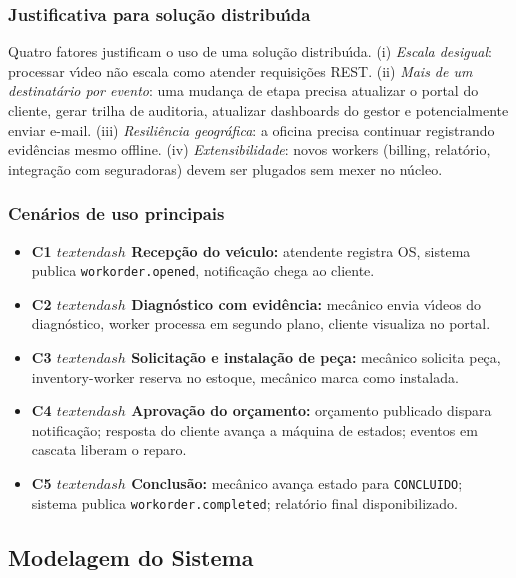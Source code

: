 \documentclass[10pt,a4paper]{article}
\begin{document}
\subsubsection*{Justificativa para solu\c{c}\~ao distribu\'\i da}

Quatro fatores justificam o uso de uma solu\c{c}\~ao distribu\'\i da. (i) \emph{Escala desigual}: processar v\'\i deo n\~ao escala como atender requisi\c{c}\~oes REST. (ii) \emph{Mais de um destinat\'ario por evento}: uma mudan\c{c}a de etapa precisa atualizar o portal do cliente, gerar trilha de auditoria, atualizar dashboards do gestor e potencialmente enviar e-mail. (iii) \emph{Resili\^encia geogr\'afica}: a oficina precisa continuar registrando evid\^encias mesmo offline. (iv) \emph{Extensibilidade}: novos workers (billing, relat\'orio, integra\c{c}\~ao com seguradoras) devem ser plugados sem mexer no n\'ucleo.

\subsubsection*{Cen\'arios de uso principais}
\begin{itemize}[leftmargin=*]
\item \textbf{C1 \(textendash\) Recep\c{c}\~ao do ve\'\i culo:} atendente registra OS, sistema publica \texttt{workorder.opened}, notifica\c{c}\~ao chega ao cliente.
\item \textbf{C2 \(textendash\) Diagn\'ostico com evid\^encia:} mec\^anico envia v\'\i deos do diagn\'ostico, worker processa em segundo plano, cliente visualiza no portal.
\item \textbf{C3 \(textendash\) Solicita\c{c}\~ao e instala\c{c}\~ao de pe\c{c}a:} mec\^anico solicita pe\c{c}a, inventory-worker reserva no estoque, mec\^anico marca como instalada.
\item \textbf{C4 \(textendash\) Aprova\c{c}\~ao do or\c{c}amento:} or\c{c}amento publicado dispara notifica\c{c}\~ao; resposta do cliente avan\c{c}a a m\'aquina de estados; eventos em cascata liberam o reparo.
\item \textbf{C5 \(textendash\) Conclus\~ao:} mec\^anico avan\c{c}a estado para \texttt{CONCLUIDO}; sistema publica \texttt{workorder.completed}; relat\'orio final disponibilizado.
\end{itemize}

\subsection{Modelagem do Sistema}
\end{document}
